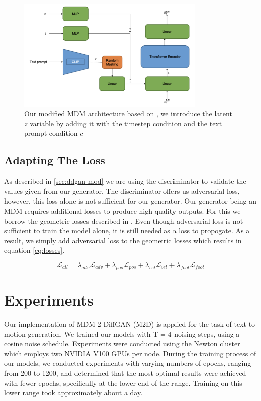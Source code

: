 \documentclass[10pt,twocolumn,letterpaper]{article}
\begin{document}
\begin{figure}[ht]
	\centering
	\includegraphics[width=0.8\textwidth]{imgs/modified-MDM.png}
	\caption{Our modified MDM architecture based on \cite{Tevet23}, we introduce the latent $z$ variable by adding it with the timestep condition and the text prompt condition $c$}
	\label{fig:modified-mdm]}
\end{figure}

\subsection{Adapting The Loss}

As described in \ref{sec:ddgan-mod} we are using the discriminator to validate the values given from our generator. The discriminator offers us adversarial loss, however, this loss alone is not sufficient for our generator. Our generator being an MDM requires additional losses to produce high-quality outputs. For this we borrow the geometric losses described in \cite{Tevet23}. Even though adversarial loss is not sufficient to train the model alone, it is still needed as a loss to propogate. As a result, we simply add adversarial loss to the geometric losses which results in equation \ref{eq:losses}.

\begin{equation}\label{eq:losses}
	\mathcal{L}_{all} = \lambda_{adv}\mathcal{L}_{adv} + \lambda_{pos}\mathcal{L}_{pos} + \lambda_{vel}\mathcal{L}_{vel} + \lambda_{foot}\mathcal{L}_{foot} 
\end{equation}

\section{Experiments}
\label{sec:experiments}
Our implementation of MDM-2-DiffGAN (M2D) is applied for the task of text-to-motion generation. We trained our models with T = 4 noising steps, 
using a cosine noise schedule. Experiments were conducted using the Newton cluster which employs two NVIDIA V100 GPUs per node. During the 
training process of our models, we conducted experiments with varying numbers of epochs, ranging from 200 to 1200, and determined that the 
most optimal results were achieved with fewer epochs, specifically at the lower end of the range. Training on this lower range took approximately
about a day.
\\
\end{document}
